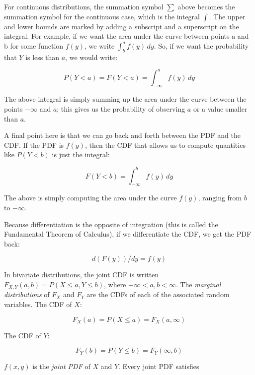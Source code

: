 \documentclass[12pt,]{krantz}
\begin{document}
For continuous distributions, the summation symbol \(\sum\) above becomes the summation symbol for the continuous case, which is the integral \(\int\). The upper and lower bounds are marked by adding a subscript and a superscript on the integral. For example, if we want the area under the curve between points a and b for some function \(f(y)\), we write \(\int_b^a f(y)\, dy\). So, if we want the probability that \(Y\) is less than \(a\), we would write:

\begin{equation}
P(Y<a) = F(Y<a) =\int_{-\infty}^{a} f(y)\, dy
\end{equation}

The above integral is simply summing up the area under the curve between the points \(-\infty\) and \(a\); this gives us the probability of observing \(a\) or a value smaller than \(a\).

A final point here is that we can go back and forth between the PDF and the CDF. If the PDF is \(f(y)\), then the CDF that allows us to compute quantities like \(P(Y<b)\) is just the integral:

\begin{equation}
F(Y<b)=\int_{-\infty}^b f(y)\, dy
\end{equation}

The above is simply computing the area under the curve \(f(y)\), ranging from \(b\) to \(-\infty\).

Because differentiation is the opposite of integration (this is called the Fundamental Theorem of Calculus), if we differentiate the CDF, we get the PDF back:

\begin{equation}
d(F(y))/dy=f(y)
\end{equation}

In bivariate distributions, the joint CDF is written \(F_{X,Y}(a,b)=P(X\leq a, Y\leq b)\), where \(-\infty < a,b<\infty\). The \emph{marginal distributions} of \(F_X\) and \(F_Y\) are the CDFs of each of the associated random variables. The CDF of \(X\):

\begin{equation}
F_X(a) = P(X\leq a) = F_X(a,\infty)	
\end{equation}

The CDF of \(Y\):

\begin{equation}
F_Y(b) = P(Y\leq b) = F_Y(\infty,b)	
\end{equation}

\(f(x,y)\) is the \emph{joint PDF} of \(X\) and \(Y\). Every joint PDF satisfies
\end{document}
